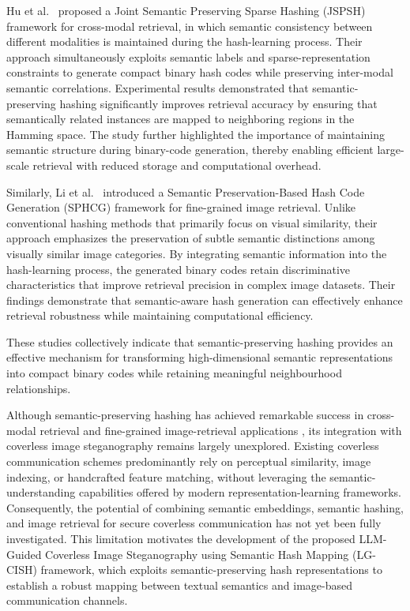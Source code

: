\documentclass[10pt,a4paper]{article}
\theoremstyle{definition}
\begin{document}
Hu et al.\ \cite{huJSPSH} proposed a Joint Semantic Preserving Sparse Hashing (JSPSH) framework
for cross-modal retrieval, in which semantic consistency between different
modalities is maintained during the hash-learning process. Their approach
simultaneously exploits semantic labels and sparse-representation constraints to
generate compact binary hash codes while preserving inter-modal semantic
correlations. Experimental results demonstrated that semantic-preserving hashing
significantly improves retrieval accuracy by ensuring that semantically related
instances are mapped to neighboring regions in the Hamming space. The study further
highlighted the importance of maintaining semantic structure during binary-code
generation, thereby enabling efficient large-scale retrieval with reduced storage
and computational overhead.

Similarly, Li et al.\ \cite{liSPHCG} introduced a Semantic Preservation-Based Hash Code
Generation (SPHCG) framework for fine-grained image retrieval. Unlike conventional
hashing methods that primarily focus on visual similarity, their approach emphasizes
the preservation of subtle semantic distinctions among visually similar image
categories. By integrating semantic information into the hash-learning process, the
generated binary codes retain discriminative characteristics that improve retrieval
precision in complex image datasets. Their findings demonstrate that semantic-aware
hash generation can effectively enhance retrieval robustness while maintaining
computational efficiency.

These studies collectively indicate that semantic-preserving hashing provides an
effective mechanism for transforming high-dimensional semantic representations into
compact binary codes while retaining meaningful neighbourhood relationships.

Although semantic-preserving hashing has achieved remarkable success in cross-modal
retrieval and fine-grained image-retrieval applications \cite{huJSPSH,liSPHCG}, its integration with
coverless image steganography remains largely unexplored. Existing coverless
communication schemes predominantly rely on perceptual similarity, image indexing,
or handcrafted feature matching, without leveraging the semantic-understanding
capabilities offered by modern representation-learning frameworks. Consequently, the
potential of combining semantic embeddings, semantic hashing, and image retrieval
for secure coverless communication has not yet been fully investigated. This
limitation motivates the development of the proposed LLM-Guided Coverless Image
Steganography using Semantic Hash Mapping (LG-CISH) framework, which exploits
semantic-preserving hash representations to establish a robust mapping between
textual semantics and image-based communication channels.
\end{document}
